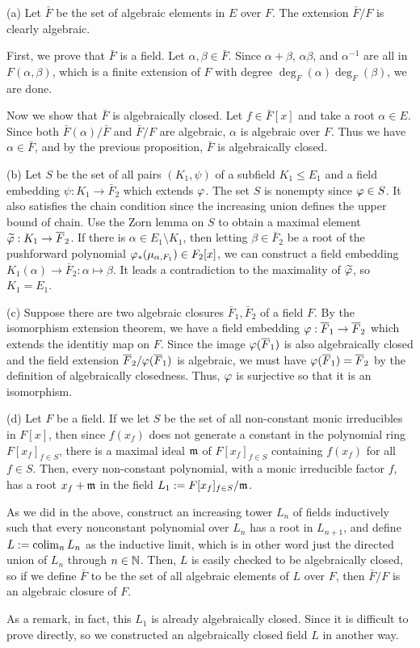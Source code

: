 \documentclass{../../large}
\begin{document}
\begin{pf}
(a)
Let $\bar F$ be the set of algebraic elements in $E$ over $F$.
The extension $\bar F/F$ is clearly algebraic.

First, we prove that $\bar F$ is a field.
Let $\alpha,\beta\in\bar F$.
Since $\alpha+\beta$, $\alpha\beta$, and $\alpha^{-1}$ are all in $F(\alpha,\beta)$, which is a finite extension of $F$ with degree $\deg_F(\alpha)\deg_F(\beta)$, we are done.

Now we show that $\bar F$ is algebraically closed.
Let $f\in\bar F[x]$ and take a root $\alpha\in E$.
Since both $\bar F(\alpha)/\bar F$ and $\bar F/F$ are algebraic, $\alpha$ is algebraic over $F$.
Thus we have $\alpha\in\bar F$, and by the previous proposition, $\bar F$ is algebraically closed.


(b)
Let $S$ be the set of all pairs $(K_1,\psi)$ of a subfield $K_1\le E_1$ and a field embedding $\psi:K_1\to\bar F_2$ which extends $\varphi$.
The set $S$ is nonempty since $\varphi\in S$.
It also satisfies the chain condition since the increasing union defines the upper bound of chain.
Use the Zorn lemma on $S$ to obtain a maximal element $\widetilde{\varphi}:K_1\to\overline F_2$.
If there is $\alpha\in E_1\setminus K_1$, then letting $\beta\in\bar F_2$ be a root of the pushforward polynomial $\varphi_*(\mu_{\alpha,F_1})\in F_2[x]$, we can construct a field embedding $K_1(\alpha)\to\bar F_2:\alpha\mapsto\beta$.
It leads a contradiction to the maximality of $\widetilde{\varphi}$, so $K_1=E_1$.

(c)
Suppose there are two algebraic closures $\bar F_1, \bar F_2$ of a field $F$.
By the isomorphism extension theorem, we have a field embedding $\varphi:\overline F_1\to\overline F_2$ which extends the identitiy map on $F$.
Since the image $\varphi(\overline F_1)$ is also algebraically closed and the field extension $\overline F_2/\varphi(\overline F_1)$ is algebraic, we must have $\varphi(\overline F_1)=\overline F_2$ by the definition of algebraically closedness.
Thus, $\varphi$ is surjective so that it is an isomorphism.

(d)
Let $F$ be a field.
If we let $S$ be the set of all non-constant monic irreducibles in $F[x]$, then since $f(x_f)$ does not generate a constant in the polynomial ring $F[x_f]_{f\in S}$, there is a maximal ideal $\mathfrak{m}$ of $F[x_f]_{f\in S}$ containing $f(x_f)$ for all $f\in S$.
Then, every non-constant polynomial, with a monic irreducible factor $f$, has a root $x_f+\mathfrak{m}$ in the field $L_1:=F[x_f]_{f\in S}/\mathfrak{m}$.

As we did in the above, construct an increasing tower $L_n$ of fields inductively such that every nonconstant polynomial over $L_n$ has a root in $L_{n+1}$, and define $L:=\operatorname*{colim}_nL_n$ as the inductive limit, which is in other word just the directed union of $L_n$ through $n\in\mathbb{N}$.
Then, $L$ is easily checked to be algebraically closed, so if we define $\bar F$ to be the set of all algebraic elements of $L$ over $F$, then $\bar F/F$ is an algebraic closure of $F$.

As a remark, in fact, this $L_1$ is already algebraically closed.
Since it is difficult to prove directly, so we constructed an algebraically closed field $L$ in another way.
\end{pf}
\end{document}
